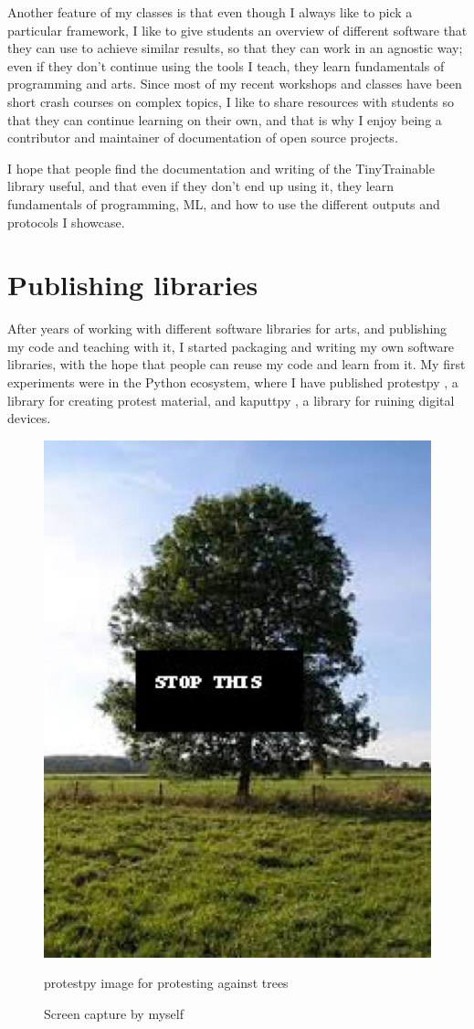 Another feature of my classes is that even though I always like to pick a particular framework, I like to give students an overview of different software that they can use to achieve similar results, so that they can work in an agnostic way; even if they don't continue using the tools I teach, they learn fundamentals of programming and arts. Since most of my recent workshops and classes have been short crash courses on complex topics, I like to share resources with students so that they can continue learning on their own, and that is why I enjoy being a contributor and maintainer of documentation of open source projects.

I hope that people find the documentation and writing of the TinyTrainable library useful, and that even if they don't end up using it, they learn fundamentals of programming, \acrshort{ML}, and how to use the different outputs and protocols I showcase.

\section{Publishing libraries}

After years of working with different software libraries for arts, and publishing my code and teaching with it, I started packaging and writing my own software libraries, with the hope that people can reuse my code and learn from it. My first experiments were in the Python ecosystem, where I have published protestpy \cite{website-pypi-protestpy}, a library for creating protest material, and kaputtpy \cite{website-pypi-kaputtpy}, a library for ruining digital devices.

\begin{figure}[ht]
  \centering
  \includegraphics[width=0.75\linewidth,height=0.35\textheight,keepaspectratio]{images/protestpy.jpg}
  \caption{protestpy image for protesting against trees}
  \caption*{Screen capture by myself}
  \label{fig:protestpy-tree}
\end{figure}

